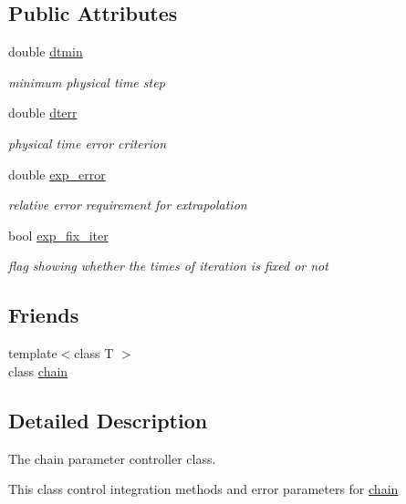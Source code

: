 \subsection*{Public Attributes}
\begin{DoxyCompactItemize}
\item 
double \hyperlink{classARC_1_1chainpars_ac414014d19915aecb35245ba11649c2e}{dtmin}
\begin{DoxyCompactList}\small\item\em minimum physical time step \end{DoxyCompactList}\item 
double \hyperlink{classARC_1_1chainpars_ad3a3e8f9199180ec82b9c257b1e8570e}{dterr}
\begin{DoxyCompactList}\small\item\em physical time error criterion \end{DoxyCompactList}\item 
double \hyperlink{classARC_1_1chainpars_a7ee477ebe8b1d67457891ab58560c074}{exp\+\_\+error}
\begin{DoxyCompactList}\small\item\em relative error requirement for extrapolation \end{DoxyCompactList}\item 
bool \hyperlink{classARC_1_1chainpars_a3f16e6ea9497e294265c4a17df0394ba}{exp\+\_\+fix\+\_\+iter}
\begin{DoxyCompactList}\small\item\em flag showing whether the times of iteration is fixed or not \end{DoxyCompactList}\end{DoxyCompactItemize}
\subsection*{Friends}
\begin{DoxyCompactItemize}
\item 
{\footnotesize template$<$class T $>$ }\\class \hyperlink{classARC_1_1chainpars_a498fbb4337b9878a5f0044996e4a2489}{chain}
\end{DoxyCompactItemize}


\subsection{Detailed Description}
The chain parameter controller class. 

This class control integration methods and error parameters for \hyperlink{classARC_1_1chain}{chain} 


